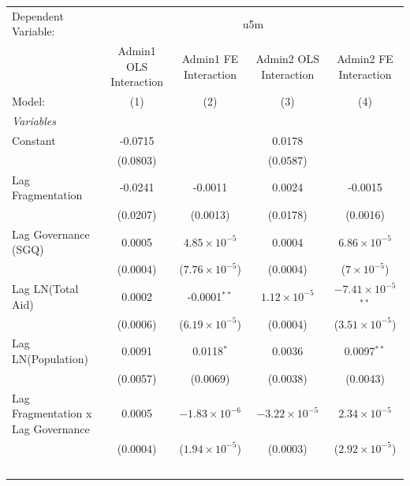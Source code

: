 \begingroup
\centering
\begin{tabular}{lcccc}
   \tabularnewline \midrule \midrule
   Dependent Variable: & \multicolumn{4}{c}{u5m}\\
                                      & Admin1 OLS Interaction & Admin1 FE Interaction   & Admin2 OLS Interaction & Admin2 FE Interaction \\   
   Model:                             & (1)                    & (2)                     & (3)                    & (4)\\  
   \midrule
   \emph{Variables}\\
   Constant                           & -0.0715                &                         & 0.0178                 &   \\   
                                      & (0.0803)               &                         & (0.0587)               &   \\   
   Lag Fragmentation                  & -0.0241                & -0.0011                 & 0.0024                 & -0.0015\\   
                                      & (0.0207)               & (0.0013)                & (0.0178)               & (0.0016)\\   
   Lag Governance (SGQ)               & 0.0005                 & $4.85\times 10^{-5}$    & 0.0004                 & $6.86\times 10^{-5}$\\    
                                      & (0.0004)               & ($7.76\times 10^{-5}$)  & (0.0004)               & ($7\times 10^{-5}$)\\    
   Lag LN(Total Aid)                  & 0.0002                 & -0.0001$^{**}$          & $1.12\times 10^{-5}$   & $-7.41\times 10^{-5}$$^{**}$\\    
                                      & (0.0006)               & ($6.19\times 10^{-5}$)  & (0.0004)               & ($3.51\times 10^{-5}$)\\    
   Lag LN(Population)                 & 0.0091                 & 0.0118$^{*}$            & 0.0036                 & 0.0097$^{**}$\\   
                                      & (0.0057)               & (0.0069)                & (0.0038)               & (0.0043)\\   
   Lag Fragmentation x Lag Governance & 0.0005                 & $-1.83\times 10^{-6}$   & $-3.22\times 10^{-5}$  & $2.34\times 10^{-5}$\\    
                                      & (0.0004)               & ($1.94\times 10^{-5}$)  & (0.0003)               & ($2.92\times 10^{-5}$)\\    
$$
\end{tabular}
